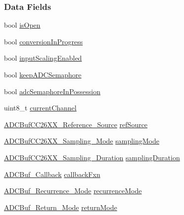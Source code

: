 \subsubsection*{Data Fields}
\begin{DoxyCompactItemize}
\item 
bool \hyperlink{struct_a_d_c_buf_c_c26_x_x___object_a1bf829277faa9736e5be4f0d87f0bcf5}{is\+Open}
\item 
bool \hyperlink{struct_a_d_c_buf_c_c26_x_x___object_a5f8b6f2676024eedcc7e9a8179088c91}{conversion\+In\+Progress}
\item 
bool \hyperlink{struct_a_d_c_buf_c_c26_x_x___object_aba2a0b51386853802f9d9bf9edb07c1e}{input\+Scaling\+Enabled}
\item 
bool \hyperlink{struct_a_d_c_buf_c_c26_x_x___object_a69752da5d0adc5ee7fd021b1eea0c707}{keep\+A\+D\+C\+Semaphore}
\item 
bool \hyperlink{struct_a_d_c_buf_c_c26_x_x___object_aab19a1003d92358ddbf444bbc9c3e36c}{adc\+Semaphore\+In\+Possession}
\item 
uint8\+\_\+t \hyperlink{struct_a_d_c_buf_c_c26_x_x___object_ad1e14f148db3baabbac7644e77e00ca0}{current\+Channel}
\item 
\hyperlink{_a_d_c_buf_c_c26_x_x_8h_a31a41d718712f3d4ff936bb566da0d0a}{A\+D\+C\+Buf\+C\+C26\+X\+X\+\_\+\+Reference\+\_\+\+Source} \hyperlink{struct_a_d_c_buf_c_c26_x_x___object_a29b696a02137128f84aac8a3fa60fb31}{ref\+Source}
\item 
\hyperlink{_a_d_c_buf_c_c26_x_x_8h_a816f299f98f8fc3cc1124cda74a18d10}{A\+D\+C\+Buf\+C\+C26\+X\+X\+\_\+\+Sampling\+\_\+\+Mode} \hyperlink{struct_a_d_c_buf_c_c26_x_x___object_af70f09e989b6c8df42119ac36ad41b23}{sampling\+Mode}
\item 
\hyperlink{_a_d_c_buf_c_c26_x_x_8h_a4a95bf383dea0206b6708496a034a9fb}{A\+D\+C\+Buf\+C\+C26\+X\+X\+\_\+\+Sampling\+\_\+\+Duration} \hyperlink{struct_a_d_c_buf_c_c26_x_x___object_af37e3b1c0eeb86c35997a244baf0cf2f}{sampling\+Duration}
\item 
\hyperlink{_a_d_c_buf_8h_a477c377c65f8de04aa67ff7eefa0a4cf}{A\+D\+C\+Buf\+\_\+\+Callback} \hyperlink{struct_a_d_c_buf_c_c26_x_x___object_af0c5372ecade25efaff87f09c1088f01}{callback\+Fxn}
\item 
\hyperlink{_a_d_c_buf_8h_af15cc4961b02af48216132c2b8bc88f1}{A\+D\+C\+Buf\+\_\+\+Recurrence\+\_\+\+Mode} \hyperlink{struct_a_d_c_buf_c_c26_x_x___object_acdb55bda8b02fca3fa51f7ebfae6c42b}{recurrence\+Mode}
\item 
\hyperlink{_a_d_c_buf_8h_a3d643e8024503c5ef2679c83419ba6ee}{A\+D\+C\+Buf\+\_\+\+Return\+\_\+\+Mode} \hyperlink{struct_a_d_c_buf_c_c26_x_x___object_afce391d0185d4c1cf19c912d966b2aee}{return\+Mode}

\end{DoxyCompactItemize}
